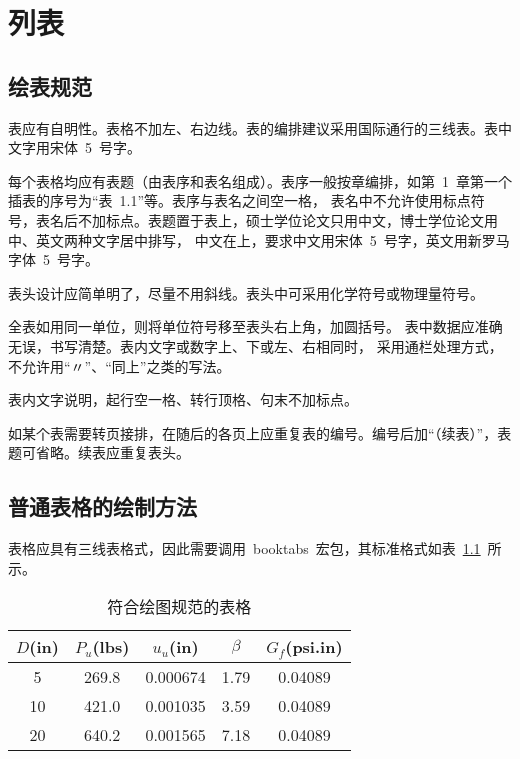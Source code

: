 
%
%
%

\chapter{列表}
\label{chap04}

\section{绘表规范}

表应有自明性。表格不加左、右边线。表的编排建议采用国际通行的三线表。表中文字用宋体~5~号字。

每个表格均应有表题（由表序和表名组成）。表序一般按章编排，如第~1~章第一个插表的序号为“表~1.1”等。表序与表名之间空一格，
表名中不允许使用标点符号，表名后不加标点。表题置于表上，硕士学位论文只用中文，博士学位论文用中、英文两种文字居中排写，
中文在上，要求中文用宋体~5~号字，英文用新罗马字体~5~号字。

表头设计应简单明了，尽量不用斜线。表头中可采用化学符号或物理量符号。

全表如用同一单位，则将单位符号移至表头右上角，加圆括号。
表中数据应准确无误，书写清楚。表内文字或数字上、下或左、右相同时，
采用通栏处理方式，不允许用“〃”、“同上”之类的写法。

表内文字说明，起行空一格、转行顶格、句末不加标点。

如某个表需要转页接排，在随后的各页上应重复表的编号。编号后加“（续表）”，表题可省略。续表应重复表头。

\section{普通表格的绘制方法}

表格应具有三线表格式，因此需要调用~booktabs~宏包，其标准格式如表~\ref{tab:table1}~所示。
\begin{table}[htbp]
  \caption{符合绘图规范的表格}
  \label{tab:table1}
  \vspace{0.5em}\centering\wuhao
  \begin{tabular}{ccccc}
    \toprule[1.5pt]
    $D$(in) & $P_u$(lbs) & $u_u$(in) & $\beta$ & $G_f$(psi.in) \\
    \midrule[1pt]
    5       & 269.8      & 0.000674  & 1.79    & 0.04089       \\
    10      & 421.0      & 0.001035  & 3.59    & 0.04089       \\
    20      & 640.2      & 0.001565  & 7.18    & 0.04089       \\
    \bottomrule[1.5pt]
  \end{tabular}
\end{table}

